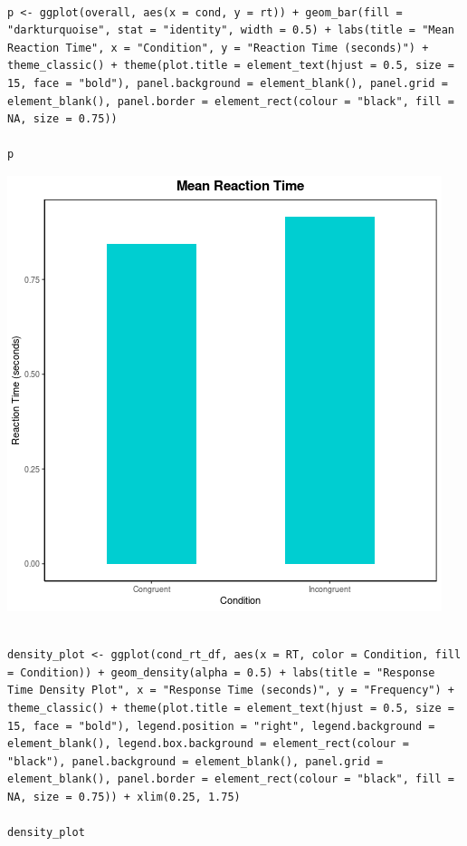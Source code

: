 \documentclass{article}
\begin{document}
\begin{verbatim}

p <- ggplot(overall, aes(x = cond, y = rt)) + geom_bar(fill = "darkturquoise", stat = "identity", width = 0.5) + labs(title = "Mean Reaction Time", x = "Condition", y = "Reaction Time (seconds)") + theme_classic() + theme(plot.title = element_text(hjust = 0.5, size = 15, face = "bold"), panel.background = element_blank(), panel.grid = element_blank(), panel.border = element_rect(colour = "black", fill = NA, size = 0.75))

p

\end{verbatim}

\begin{center}
\includegraphics[width=.9\linewidth]{converted_stroop2.png}
\end{center}



\begin{verbatim}

density_plot <- ggplot(cond_rt_df, aes(x = RT, color = Condition, fill = Condition)) + geom_density(alpha = 0.5) + labs(title = "Response Time Density Plot", x = "Response Time (seconds)", y = "Frequency") + theme_classic() + theme(plot.title = element_text(hjust = 0.5, size = 15, face = "bold"), legend.position = "right", legend.background = element_blank(), legend.box.background = element_rect(colour = "black"), panel.background = element_blank(), panel.grid = element_blank(), panel.border = element_rect(colour = "black", fill = NA, size = 0.75)) + xlim(0.25, 1.75) 

density_plot

\end{verbatim}
\end{document}
